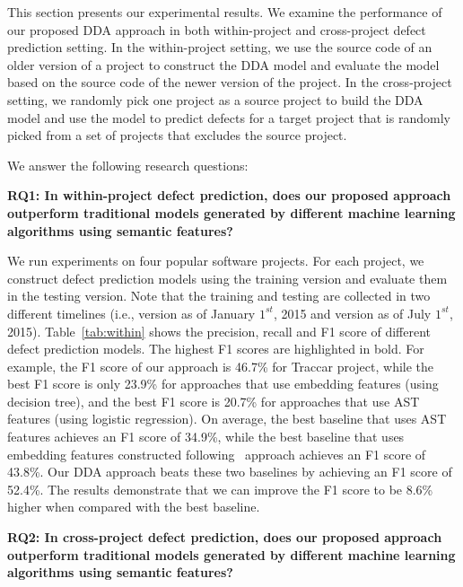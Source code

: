 This section presents our experimental results. We examine the performance of our proposed DDA approach in both within-project and cross-project defect prediction setting. In the within-project setting, we use the source code of an older version of a project to construct the DDA model and evaluate the model based on the source code of the newer version of the project. In the cross-project setting, we randomly pick one project as a source project to build the DDA model and use the model to predict defects for a target project that is randomly picked from a set of projects that excludes the source project.

We answer the following research questions: 

\textbf{RQ1: In within-project defect prediction, does our proposed approach outperform traditional models generated by different machine learning algorithms using semantic features?}

We run experiments on four popular software projects. For each project, we construct defect prediction models using the training version and evaluate them in the testing version. Note that the training and testing are collected in two different timelines (i.e., version as of January $1^{st}$, 2015 and version as of July $1^{st}$, 2015).
Table~\ref{tab:within} shows the precision, recall and F1 score of different defect prediction models. The highest F1 scores are highlighted in bold. For example, the F1 score of our approach is 46.7\% for Traccar project, while the best F1 score is only 23.9\% for approaches that use embedding features (using decision tree), and the best F1 score is 20.7\% for approaches that use AST features (using logistic regression). On average, the best baseline that uses AST features achieves an F1 score of 34.9\%, while the best baseline that uses embedding features constructed following~\cite{wang2016automatically} approach achieves an F1 score of 43.8\%. Our DDA approach beats these two baselines by achieving an F1 score of 52.4\%. The results demonstrate that we can improve the F1 score to be 8.6\% higher when compared with the best baseline. 


\textbf{RQ2: In cross-project defect prediction, does our proposed approach outperform traditional models generated by different machine learning algorithms using semantic features?}

